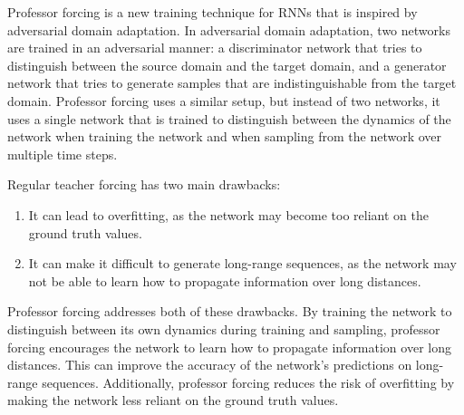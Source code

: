 \documentclass{report}
\begin{document}
Professor forcing is a new training technique for RNNs that is inspired by adversarial domain adaptation. In adversarial domain adaptation, two networks are trained in an adversarial manner: a discriminator network that tries to distinguish between the source domain and the target domain, and a generator network that tries to generate samples that are indistinguishable from the target domain. Professor forcing uses a similar setup, but instead of two networks, it uses a single network that is trained to distinguish between the dynamics of the network when training the network and when sampling from the network over multiple time steps.

Regular teacher forcing has two main drawbacks:

\begin{enumerate}
	\item It can lead to overfitting, as the network may become too reliant on the ground truth values.

	\item It can make it difficult to generate long-range sequences, as the network may not be able to learn how to propagate information over long distances.
\end{enumerate}

Professor forcing addresses both of these drawbacks. By training the network to distinguish between its own dynamics during training and sampling, professor forcing encourages the network to learn how to propagate information over long distances. This can improve the accuracy of the network's predictions on long-range sequences. Additionally, professor forcing reduces the risk of overfitting by making the network less reliant on the ground truth values.
\end{document}
